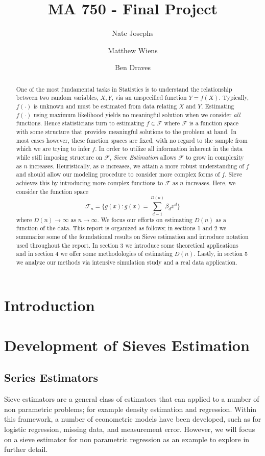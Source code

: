 \documentclass[12pt]{article}  %
\title{MA 750 - Final Project}
\author{
  Nate Josephs\\
  \and
  Matthew Wiens 
  \and 
  Ben Draves
}
\begin{document}
\maketitle 

\begin{abstract} One of the most fundamental tasks in Statistics is to understand the relationship between two random variables, $X,Y$, via an unspecified function $Y = f(X)$. Typically, $f(\cdot)$ is unknown and must be estimated from data relating $X$ and $Y$. Estimating $f(\cdot)$ using maximum likelihood yields no meaningful solution when we consider \textit{all} functions. Hence statisticians turn to estimating $f\in\mathcal{F}$ where $\mathcal{F}$ is a function space with some structure that provides meaningful solutions to the problem at hand. In most cases however, these function spaces are fixed, with no regard to the sample from which we are trying to infer $f$. In order to utilize all information inherent in the data while still imposing structure on $\mathcal{F}$, \textit{Sieve Estimation} allows $\mathcal{F}$ to grow in complexity as $n$ increases. Heuristically, as $n$ increases, we attain a more robust understanding of $f$ and should allow our modeling procedure to consider more complex forms of $f$. Sieve achieves this by introducing more complex functions to $\mathcal{F}$ as $n$ increases. Here, we consider the function space $$\mathcal{F}_n = \Big\{g(x): g(x) = \sum_{d=1}^{D(n)}\beta_dx^d\Big\}$$ where $D(n)\to\infty$ as $n\to\infty$. We focus our efforts on estimating $D(n)$ as a function of the data. This report is organized as follows; in sections 1 and 2 we summarize some of the foundational results on Sieve estimation and introduce notation used throughout the report. In section 3 we introduce some theoretical applications and in section 4 we offer some methodologies of estimating $D(n)$. Lastly, in section 5 we analyze our methods via intensive simulation study and a real data application.


\end{abstract}
  
\section{Introduction}
\section{Development of Sieves Estimation}

\subsection{Series Estimators}
Sieve estimators are a general class of estimators that can applied to a number of non parametric problems; for example density estimation and regression. Within this framework, a number of econometric models have been developed, such as for logistic regression, missing data, and measurement error. However, we will focus on a sieve estimator for non parametric regression as an example to explore in further detail. 
\end{document}
